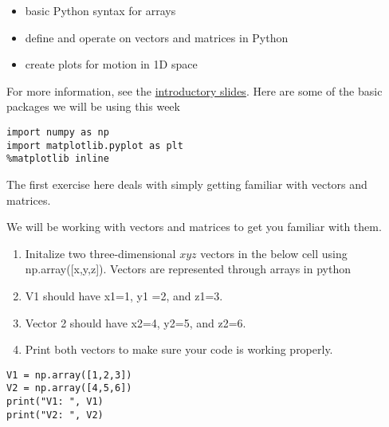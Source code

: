 \documentclass[%
oneside,                 %
final,                   %
10pt]{article}
\begin{document}
\begin{itemize}
\item basic Python syntax for arrays

\item define and operate on vectors and matrices in Python

\item create plots for motion in 1D space
\end{itemize}

\noindent
For more information, see the \href{{https://mhjensen.github.io/Physics321/doc/pub/week2/html/week2.html}}{introductory slides}.
Here are some of the basic packages we will be using this week




\begin{verbatim}
import numpy as np 
import matplotlib.pyplot as plt
%matplotlib inline

\end{verbatim}


The first exercise here deals with simply getting familiar with vectors and matrices.

We will be working with vectors and matrices to get you familiar with them.

\begin{enumerate}
\item Initalize two three-dimensional $xyz$ vectors in the below cell using np.array([x,y,z]). Vectors are represented through arrays in python

\item V1 should have x1=1, y1 =2, and z1=3. 

\item Vector 2 should have x2=4, y2=5,  and z2=6. 

\item Print both vectors to make sure your code is working properly.
\end{enumerate}

\noindent





\begin{verbatim}
V1 = np.array([1,2,3])
V2 = np.array([4,5,6])
print("V1: ", V1)
print("V2: ", V2)

\end{verbatim}
\end{document}
